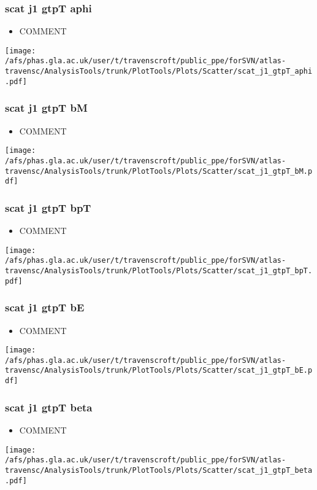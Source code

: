 \documentclass{beamer}
\begin{document}
\begin{frame}
\frametitle{scat j1 gtpT aphi}
\begin{itemize}
\item COMMENT
\end{itemize}
\begin{center}
\texttt{[image: /afs/phas.gla.ac.uk/user/t/travenscroft/public\_ppe/forSVN/atlas-travensc/AnalysisTools/trunk/PlotTools/Plots/Scatter/scat\_j1\_gtpT\_aphi.pdf]}
\end{center}
\end{frame}

\begin{frame}
\frametitle{scat j1 gtpT bM}
\begin{itemize}
\item COMMENT
\end{itemize}
\begin{center}
\texttt{[image: /afs/phas.gla.ac.uk/user/t/travenscroft/public\_ppe/forSVN/atlas-travensc/AnalysisTools/trunk/PlotTools/Plots/Scatter/scat\_j1\_gtpT\_bM.pdf]}
\end{center}
\end{frame}

\begin{frame}
\frametitle{scat j1 gtpT bpT}
\begin{itemize}
\item COMMENT
\end{itemize}
\begin{center}
\texttt{[image: /afs/phas.gla.ac.uk/user/t/travenscroft/public\_ppe/forSVN/atlas-travensc/AnalysisTools/trunk/PlotTools/Plots/Scatter/scat\_j1\_gtpT\_bpT.pdf]}
\end{center}
\end{frame}

\begin{frame}
\frametitle{scat j1 gtpT bE}
\begin{itemize}
\item COMMENT
\end{itemize}
\begin{center}
\texttt{[image: /afs/phas.gla.ac.uk/user/t/travenscroft/public\_ppe/forSVN/atlas-travensc/AnalysisTools/trunk/PlotTools/Plots/Scatter/scat\_j1\_gtpT\_bE.pdf]}
\end{center}
\end{frame}

\begin{frame}
\frametitle{scat j1 gtpT beta}
\begin{itemize}
\item COMMENT
\end{itemize}
\begin{center}
\texttt{[image: /afs/phas.gla.ac.uk/user/t/travenscroft/public\_ppe/forSVN/atlas-travensc/AnalysisTools/trunk/PlotTools/Plots/Scatter/scat\_j1\_gtpT\_beta.pdf]}
\end{center}
\end{frame}
\end{document}
